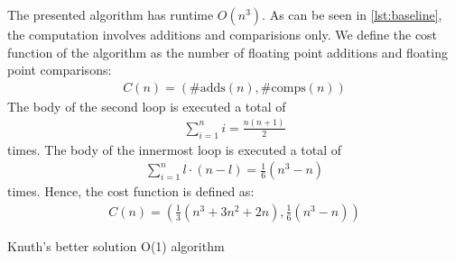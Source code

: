  The presented algorithm has runtime $O(n^3)$. As can
be seen in \autoref{lst:baseline}, the computation involves additions and
comparisions only. We define the cost function of the algorithm as the
number of floating point additions and floating point comparisons:
\begin{align*}
C(n) = (\#\text{adds}(n), \#\text{comps}(n))
\end{align*}
The body of the second loop is executed a total of
\begin{align*}
\sum_{i=1}^{n} i = \frac{n(n+1)}{2}
\end{align*}
times. The body of the innermost loop is executed a total of
\begin{align*}
\sum_{i=1}^{n} l\cdot(n-l) = \frac{1}{6}(n^3-n)
\end{align*}
times.  Hence, the cost function is defined as:
\begin{align*}
C(n) = \left(\frac{1}{3}(n^3+3n^2+2n), \frac{1}{6}(n^3 - n)\right)
\end{align*}

Knuth's better solution
O(1) algorithm
